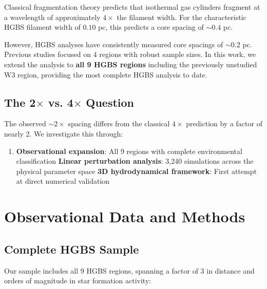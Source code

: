 \documentclass[11pt,a4paper]{article}
\begin{document}
Classical fragmentation theory \citep{Inutsuka1992} predicts that isothermal gas cylinders fragment at a wavelength of approximately $4\times$ the filament width. For the characteristic HGBS filament width of $0.10$ pc, this predicts a core spacing of $\sim0.4$ pc.

However, HGBS analyses have consistently measured core spacings of $\sim0.2$ pc. Previous studies focused on 4 regions with robust sample sizes. In this work, we extend the analysis to \textbf{all 9 HGBS regions} including the previously unstudied W3 region, providing the most complete HGBS analysis to date.

\subsection{The 2$\times$ vs. 4$\times$ Question}

The observed $\sim2\times$ spacing differs from the classical $4\times$ prediction by a factor of nearly 2. We investigate this through:

\begin{enumerate}
    \item \textbf{Observational expansion}: All 9 regions with complete environmental classification
    \textbf{Linear perturbation analysis}: 3,240 simulations across the physical parameter space
    \textbf{3D hydrodynamical framework}: First attempt at direct numerical validation
\end{enumerate}

\section{Observational Data and Methods}

\subsection{Complete HGBS Sample}

Our sample includes all 9 HGBS regions, spanning a factor of 3 in distance and orders of magnitude in star formation activity:
\end{document}
